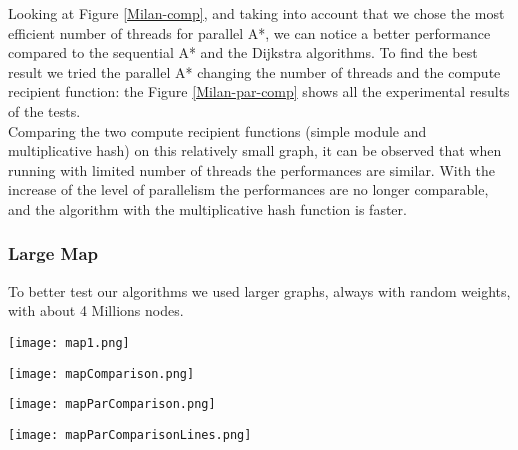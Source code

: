 Looking at Figure \ref{Milan-comp}, and taking into account that we chose the most efficient number of threads for parallel A*,
we can notice a better performance compared to the sequential A* and the Dijkstra algorithms. 
To find the best result we tried the parallel A* changing the number of threads and the compute recipient function:
the Figure \ref{Milan-par-comp} shows all the experimental results of the tests.
\\
Comparing the two compute recipient functions (simple module and multiplicative hash)
on this relatively small graph, it can be observed that when running with limited number of threads the performances are similar.
With the increase of the level of parallelism the performances are no longer comparable, and the algorithm with the multiplicative hash function is faster.


\subsubsection{Large Map}

To better test our algorithms we used larger graphs, always with random weights, with about 4 Millions nodes.


\begin{center} 
    \begin{minipage}[b]{0.3\textwidth}
        \centering
        \texttt{[image: map1.png]}
        \label{Large-map}
    \end{minipage}%
    \hspace{0.5cm}
    \begin{minipage}[b]{0.6\textwidth}
        \centering
        \texttt{[image: mapComparison.png]}
        \label{Map-comp}
    \end{minipage} 
\end{center}


\begin{center} 
    \begin{minipage}[b]{0.5\textwidth}
            \centering
            \texttt{[image: mapParComparison.png]}
            \label{Map-par-comp}
        
    \end{minipage}%
    \hspace{1cm}
    \begin{minipage}[b]{0.4\textwidth}
            \centering
            \texttt{[image: mapParComparisonLines.png]}
            \label{Map-par-comp-lines}
    \end{minipage} 
\end{center}

